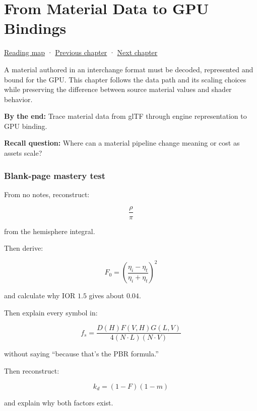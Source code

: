 \chapter{From Material Data to GPU Bindings}\label{03-visual-computing-i-ch006-from-material-data-to-gpu-bindings}\hypertarget{03-visual-computing-i-ch006}{}\label{stagechapter:03-visual-computing-i-ch006}

\hypertarget{03-visual-computing-i-ch006-from-material-data-to-gpu-bindings}{}

\hyperref[volume-reading-map]{Reading map} · \hyperref[01-foundations-i-ch016]{Previous chapter} · \hyperref[03-visual-computing-i-ch011]{Next chapter}

A material authored in an interchange format must be decoded, represented and bound for the GPU. This chapter follows the data path and its scaling choices while preserving the difference between source material values and shader behavior.

\textbf{By the end:} Trace material data from glTF through engine representation to GPU binding.

\textbf{Recall question:} Where can a material pipeline change meaning or cost as assets scale?

\subsection{Blank-page mastery test}\label{03-visual-computing-i-ch006-blank-page-mastery-test}

\hypertarget{03-visual-computing-i-ch006-blank-page-mastery-test}{}

From no notes, reconstruct:

\[
\frac{\rho}{\pi}
\]

from the hemisphere integral.

Then derive:

\[
F_0=
\left(
\frac{\eta_i-\eta_t}
{\eta_i+\eta_t}
\right)^2
\]

and calculate why IOR \(1.5\) gives about \(0.04\).

Then explain every symbol in:

\[
\boxed{
f_s=
\frac{
D(H)F(V,H)G(L,V)
}{
4(N\cdot L)(N\cdot V)
}
}
\]

without saying ``because that's the PBR formula.''

Then reconstruct:

\[
k_d=(1-F)(1-m)
\]

and explain why both factors exist.

